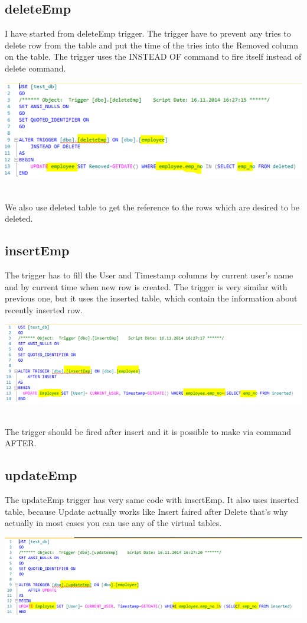 \documentclass[english]{article}
\begin{document}
\subsection{deleteEmp}
I have started from deleteEmp trigger. The trigger have to prevent any tries to delete row from the table and put the time of the tries into the Removed column on the table. The trigger uses the INSTEAD OF command to fire itself instead of delete command.\\
\centerline{\includegraphics[scale=1]{triggers/deleteEmp}}\\
We also use deleted table to get the reference to the rows which are desired to be deleted.
\subsection{insertEmp}
The trigger has to fill the User and Timestamp columns by current user's name and by current time when new row is created. The trigger is very similar with previous one, but it uses the inserted table, which contain the information about recently inserted row.
\\
\centerline{\includegraphics[scale=1]{triggers/insertEmp}}\\
 The trigger should be fired after insert and it is possible to make via command AFTER.

\subsection{updateEmp}
The updateEmp trigger has very same code with insertEmp. It also uses inserted table, because Update actually works like Insert faired after Delete that's why actually in most cases you can use any of the virtual tables.
\\
\centerline{\includegraphics[scale=1]{triggers/updateEmp}}\\
\end{document}
